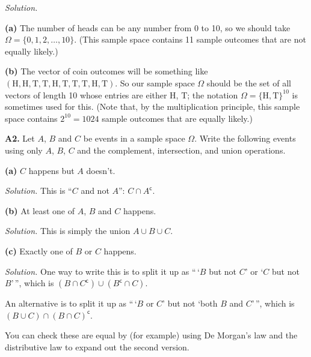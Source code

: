 \documentclass[
  a4paper,
]{book}
\theoremstyle{definition}
\theoremstyle{definition}
\theoremstyle{definition}
\theoremstyle{definition}
\theoremstyle{remark}
\begin{document}
\begin{myanswers}
\emph{Solution.}

\textbf{(a)} The number of heads can be any number from 0 to 10, so we should take \(\Omega = \{0,1,2,\dots, 10\}\). (This sample space contains 11 sample outcomes that are not equally likely.)

\textbf{(b)} The vector of coin outcomes will be something like \((\text{H}, \text{H}, \text{T}, \text{T}, \text{H}, \text{T}, \text{T}, \text{T}, \text{H}, \text{T})\). So our sample space \(\Omega\) should be the set of all vectors of length 10 whose entries are either H, T; the notation \(\Omega = \{\text{H}, \text{T}\}^{10}\) is sometimes used for this. (Note that, by the multiplication principle, this sample space contains \(2^{10} = 1024\) sample outcomes that are equally likely.)

\end{myanswers}

\textbf{A2.} Let \(A\), \(B\) and \(C\) be events in a sample space \(\Omega\). Write the following events using only \(A\), \(B\), \(C\) and the complement, intersection, and union operations.

\textbf{(a)} \(C\) happens but \(A\) doesn't.

\begin{myanswers}
\emph{Solution.} This is ``\(C\) and not \(A\)'': \(C\cap A^{\mathsf{c}}\).

\end{myanswers}

\textbf{(b)} At least one of \(A\), \(B\) and \(C\) happens.

\begin{myanswers}
\emph{Solution.} This is simply the union \(A \cup B\cup C\).

\end{myanswers}

\textbf{(c)} Exactly one of \(B\) or \(C\) happens.

\begin{myanswers}
\emph{Solution.} One way to write this is to split it up as ``\,`\(B\) but not \(C\)' or `\(C\) but not \(B\)'\,'', which is \((B \cap C^{\mathsf{c}}) \cup (B^{\mathsf{c}} \cap C)\).

An alternative is to split it up as ``\,`\(B\) or \(C\)' but not `both \(B\) and \(C\)'\,'', which is \((B \cup C) \cap (B\cap C)^{\mathsf{c}}\).

You can check these are equal by (for example) using De Morgan's law and the distributive law to expand out the second version.

\end{myanswers}
\end{document}
